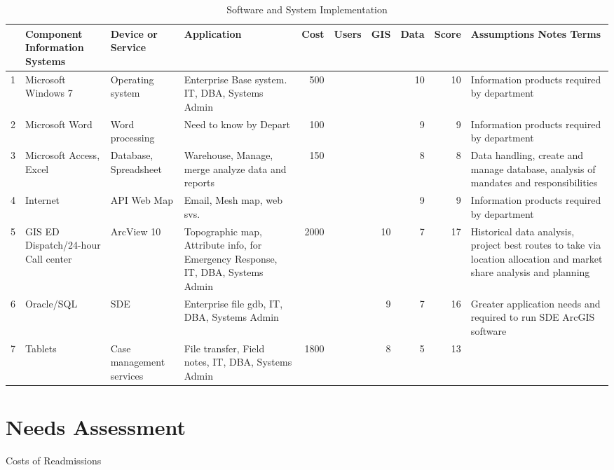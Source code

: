 \documentclass[11pt]{article}\usepackage[]{graphicx}\usepackage[]{color}
\begin{document}
\begin{itemize}
\begin{itemize}
\begin{landscape}
\begin{table}[h]
\centering
\begin{tabular}{lp{3cm}p{3cm}p{4cm}rlrrrp{5cm}}
  \hline
 & Component Information Systems & Device or Service & Application & Cost & Users & GIS & Data & Score & Assumptions Notes Terms \\ 
  \hline
1 & Microsoft Windows 7 & Operating system & Enterprise Base system. IT, DBA, Systems Admin & 500 &  &  &  10 &  10 & Information products required by department \\ 
  2 & Microsoft Word & Word processing & Need to know by Depart & 100 &  &  &   9 &   9 & Information products required by department \\ 
  3 & Microsoft Access, Excel & Database, Spreadsheet & Warehouse, Manage, merge analyze data and reports & 150 &  &  &   8 &   8 & Data handling, create and manage database, analysis of mandates and responsibilities \\ 
  4 & Internet & API Web Map & Email, Mesh map, web svs. &  &  &  &   9 &   9 & Information products required by department \\ 
  5 & GIS  ED Dispatch/24-hour Call center & ArcView 10 & Topographic map, Attribute info, for Emergency Response, IT, DBA, Systems Admin & 2000 &  &  10 &   7 &  17 & Historical data analysis, project best routes to take via location allocation and market share analysis and planning \\ 
  6 & Oracle/SQL  & SDE & Enterprise file gdb, IT, DBA, Systems Admin &  &  &   9 &   7 &  16 & Greater application needs and required to run SDE ArcGIS software \\ 
  7 & Tablets & Case management  services & File transfer, Field notes, IT, DBA, Systems Admin & 1800 &  &   8 &   5 &  13 &  \\ 
   \hline
\end{tabular}
\caption{Software and System Implementation}
    \label{tbl:FirstTable}
\end{table}

\end{landscape}

\clearpage
\newpage

\section{Needs Assessment}
Costs of Readmissions
\paragraph{}



\end{itemize}
\end{itemize}
\end{document}
